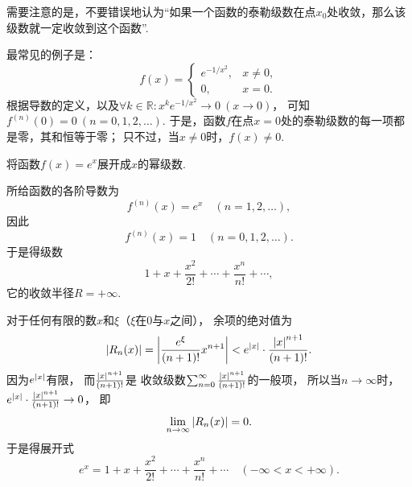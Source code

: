 需要注意的是，不要错误地认为“如果一个函数的泰勒级数在点\(x_0\)处收敛，那么该级数就一定收敛到这个函数”.
\begin{example}\label{example:无穷级数.函数的泰勒级数不一定收敛到函数}
最常见的例子是：\begin{equation*}
	f(x) = \left\{ \begin{array}{ll}
		e^{-1/x^2}, & x\neq0, \\
		0, & x=0.
	\end{array} \right.
\end{equation*}
根据导数的定义，以及\(\forall k\in\mathbb{R}: x^k e^{-1/x^2} \to 0\ (x\to0)\)，
可知\(f^{(n)}(0) = 0\ (n=0,1,2,\dotsc)\).
于是，函数\(f\)在点\(x=0\)处的泰勒级数的每一项都是零，其和恒等于零；
只不过，当\(x\neq0\)时，\(f(x)\neq0\).
\end{example}

\begin{example}
将函数\(f(x) = e^x\)展开成\(x\)的幂级数.
\begin{solution}
所给函数的各阶导数为\begin{equation*}
	f^{(n)}(x) = e^x
	\quad(n=1,2,\dotsc),
\end{equation*}
因此\begin{equation*}
	f^{(n)}(x) = 1
	\quad(n=0,1,2,\dotsc).
\end{equation*}
于是得级数\begin{equation*}
	1+x+\frac{x^2}{2!}+\dotsb+\frac{x^n}{n!}+\dotsb,
\end{equation*}它的收敛半径\(R = +\infty\).

对于任何有限的数\(x\)和\(\xi\)（\(\xi\)在\(0\)与\(x\)之间），
余项的绝对值为\begin{equation*}
	\abs{R_n(x)} = \abs{\frac{e^{\xi}}{(n+1)!} x^{n+1}}
	< e^{\abs{x}} \cdot \frac{\abs{x}^{n+1}}{(n+1)!}.
\end{equation*}
因为\(e^{\abs{x}}\)有限，
而\(\frac{\abs{x}^{n+1}}{(n+1)!}\)是
收敛级数\(\sum_{n=0}^\infty \frac{\abs{x}^{n+1}}{(n+1)!}\)的一般项，
所以当\(n\to\infty\)时，\(e^{\abs{x}} \cdot \frac{\abs{x}^{n+1}}{(n+1)!}\to0\)，
即\begin{equation*}
	\lim_{n\to\infty} \abs{R_n(x)} = 0.
\end{equation*}
于是得展开式\begin{equation*}
	e^x = 1+x+\frac{x^2}{2!}+\dotsb+\frac{x^n}{n!}+\dotsb
	\quad(-\infty<x<+\infty).
\end{equation*}
\end{solution}
\end{example}

